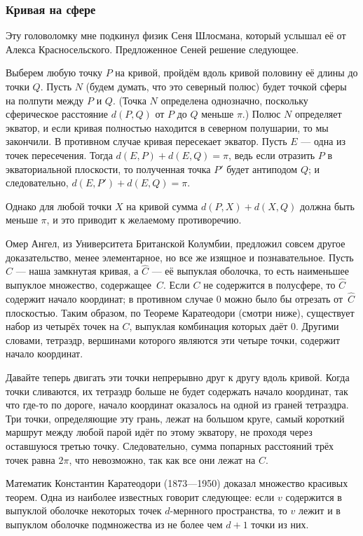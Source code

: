 \subsubsection*{Кривая на сфере}

Эту головоломку мне подкинул физик Сеня Шлосмана, который услышал её от Алекса Красносельского.
Предложенное Сеней решение следующее.

Выберем любую точку $P$ на кривой, пройдём вдоль кривой половину её длины до точки $Q$.
Пусть $N$ (будем думать, что это северный полюс) будет точкой сферы на полпути между $P$ и $Q$.
(Точка $N$ определена однозначно, поскольку сферическое расстояние $d(P, Q)$ от $P$ до $Q$ меньше $\pi$.)
Полюс $N$ определяет экватор, и если кривая полностью находится в северном полушарии, то мы закончили.
В противном случае кривая пересекает экватор.
Пусть $E$ --- одна из точек пересечения.
Тогда $d(E,P) + d(E,Q) = \pi$, ведь если отразить $P$ в экваториальной плоскости, то полученная точка $P'$ будет антиподом $Q$; и следовательно, $d(E, P') + d(E, Q) = \pi$.

Однако для любой точки $X$ на кривой сумма $d(P, X) + d(X, Q)$ должна быть меньше $\pi$, и это приводит к желаемому противоречию.

Омер Ангел, из Университета Британской Колумбии,
предложил совсем другое доказательство,
менее элементарное, но все же изящное и познавательное.
Пусть $C$ --- наша замкнутая кривая, а $\hat C$ --- её выпуклая оболочка, то есть наименьшее выпуклое множество, содержащее~$C$.
Если $C$ не содержится в полусфере, то $\hat C$ содержит начало координат;
в противном случае $0$ можно было бы отрезать от~$\hat C$ плоскостью.
Таким образом, по Теореме Каратеодори (смотри ниже), существует набор из четырёх точек на $C$, выпуклая комбинация которых даёт $0$.
Другими словами, тетраэдр, вершинами которого являются эти четыре точки, содержит начало координат.

Давайте теперь двигать эти точки непрерывно друг к другу вдоль кривой.
Когда точки сливаются, их тетраэдр больше не будет содержать начало координат, так что где-то по дороге, начало координат оказалось на одной из граней тетраэдра.
Три точки, определяющие эту грань, лежат на большом круге, самый короткий маршрут между любой парой идёт по этому экватору, не проходя через оставшуюся третью точку.
Следовательно, сумма попарных расстояний трёх точек равна $2\pi$, что невозможно, так как все они лежат на $C$.

Математик Константин Каратеодори (1873---1950) доказал множество красивых теорем.
Одна из наиболее известных говорит следующее: если $v$ содержится в выпуклой оболочке некоторых точек $d$-мернного  пространства, то $v$ лежит и в выпуклом оболочке подмножества из не более чем $d+1$ точки из них.

